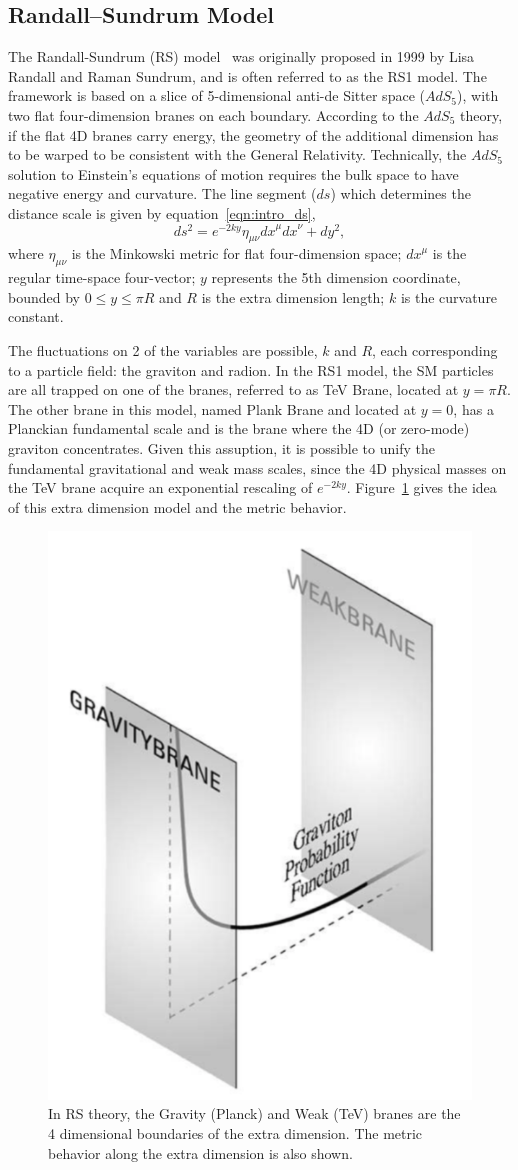 \subsection{Randall–Sundrum Model}
The Randall-Sundrum (RS) model~\cite{Intro_RS1} was originally proposed in 1999 by Lisa Randall and Raman Sundrum, and is often referred to as the RS1 model. The framework is based on a slice of 5-dimensional anti-de Sitter space ($AdS_{5}$), with two flat four-dimension branes on each boundary. According to the $AdS_{5}$ theory, if the flat 4D branes carry energy, the geometry of the additional dimension has to be warped to be consistent with the General Relativity. Technically, the $AdS_{5}$ solution to Einstein's equations of motion requires the bulk space to have negative energy and curvature. The line segment ($ds$) which determines the distance scale is given by equation~\ref{eqn:intro_ds},
\begin{equation}
ds^2 = e^{-2ky}{\eta}_{\mu\nu}{dx}^{\mu}{dx}^{\nu}+dy^2,
\label{eqn:intro_ds}
\end{equation}
where ${\eta}_{\mu\nu}$ is the Minkowski metric for flat four-dimension space; ${dx}^{\mu}$ is the regular time-space four-vector; $y$ represents the 5th dimension coordinate, bounded by $0\leq y \leq \pi R$ and $R$ is the extra dimension length; $k$ is the curvature constant.

\vspace{0.3cm}
The fluctuations on 2 of the variables are possible, $k$ and $R$, each corresponding to a particle field: the graviton and radion. In the RS1 model, the SM particles are all trapped on one of the branes, referred to as TeV Brane, located at $y=\pi R$. The other brane in this model, named Plank Brane and located at $y=0$, has a Planckian fundamental scale and is the brane where the 4D (or zero-mode) graviton concentrates. Given this assuption, it is possible to unify the fundamental gravitational and weak mass scales, since the 4D physical masses on the TeV brane acquire an exponential rescaling of $e^{-2ky}$. Figure~\ref{fig:intro_branes} gives the idea of this extra dimension model and the metric behavior.
\begin{figure}[htbp]
\begin{center}
\includegraphics[width=0.32\linewidth]{figures/intro_branes.png}
\caption{In RS theory, the Gravity (Planck) and Weak (TeV) branes are the 4 dimensional boundaries of the extra dimension. The metric behavior along the extra dimension is also shown.}
\label{fig:intro_branes}
\end{center}
\end{figure}

